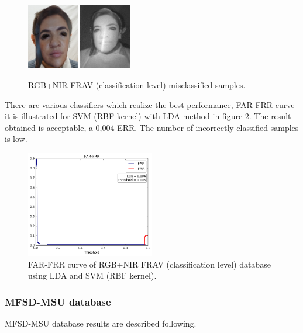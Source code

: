 \begin{figure}[htb]
\centering
\includegraphics[width=0.2\textwidth]{images_databases/frav_rgb_128.JPG}
\includegraphics[width=0.2\textwidth]{images_databases/frav_nir_128.jpg}
\caption{RGB+NIR FRAV (classification level) misclassified samples.} \label{fig:frav_clas_miscl}
\end{figure}

There are various classifiers which realize the best performance, FAR-FRR curve it is illustrated for SVM (RBF kernel) with LDA method in figure \ref{fig:RGB_FRAV_clas_FAR_FRR}. The result obtained is acceptable, a 0,004 ERR. The number of incorrectly classified samples is low.

\begin{figure}[htb]
\centering
\includegraphics[width=0.5\textwidth]{images/FAR-FRR/FRAV_clas_LDA_SVM_RBF_FAR_FRR.png}
\caption{FAR-FRR curve of RGB+NIR FRAV (classification level) database using LDA and SVM (RBF kernel).} \label{fig:RGB_FRAV_clas_FAR_FRR}
\end{figure}

\subsubsection{MFSD-MSU database}
MFSD-MSU database results are described following.\\


